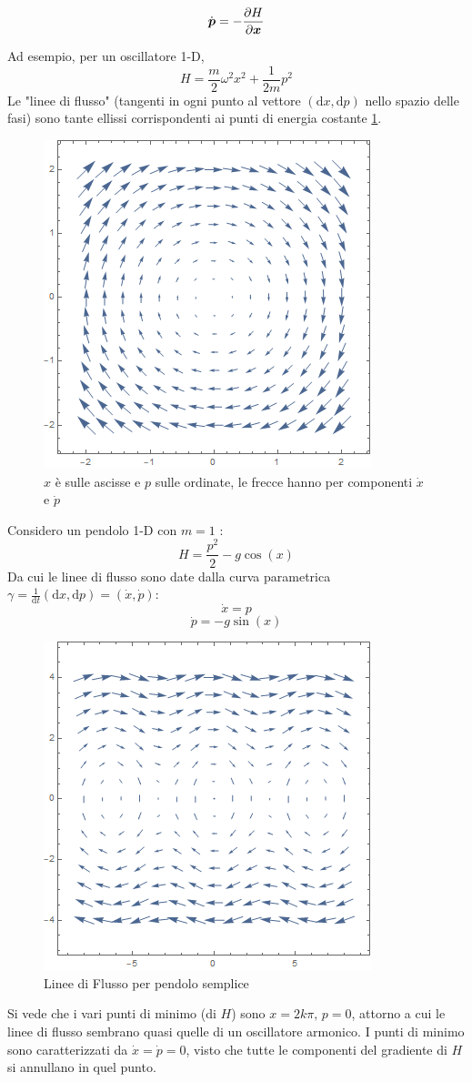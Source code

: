\documentclass[a4paper,12pt]{article}
\theoremstyle{plain}
\renewcommand{\vec}[1]{{\boldsymbol{#1}}}
\theoremstyle{definition}
\newcommand{\f}[2]{\frac{#1}{#2}}
\renewcommand{\d}{\text{d}}
\newcommand{\pos}{\vec{x}}
\newcommand{\mom}{\vec{p}}
\theoremstyle{remark}
\begin{document}
\[\dot{\mom}=-\pdv{H}{\pos}			\]

Ad esempio, per un oscillatore 1-D, \[H=\f{m}{2}\omega^2 x^2+\f{1}{2m} p^2 \]
Le "linee di flusso" (tangenti in ogni punto al vettore $(\d x,\d p)$ nello spazio delle fasi) sono tante ellissi corrispondenti ai punti di energia costante \ref{ellissi}.\\
\begin{figure}[h]
	\centering
	\includegraphics[scale=0.5]{oscillator.png}
	\caption{$x$ è sulle ascisse e $p$ sulle ordinate, le frecce hanno per componenti $\dot{x}$ e $\dot{p}$}
	\label{ellissi}
\end{figure}
Considero un pendolo 1-D con  $m=1$ :
\[H=\f{ p^2}{2}-g \cos(x)		\]
Da cui le linee di flusso sono date dalla curva parametrica $ \gamma=\f{1}{\d t}(\d x,\d p)=(\dot{x},\dot{p})$:
\[\dot{x}=p\]
\[\dot{p}=-g\sin(x)\]
\begin{figure}[h]
	\centering
	\includegraphics[scale=0.5]{pend1.png}
	\caption{Linee di Flusso per pendolo semplice}
\end{figure}
Si vede che i vari punti di minimo (di $H$) sono $x=2k\pi,\,p=0$, attorno a cui le linee di flusso sembrano quasi quelle di un oscillatore armonico. I punti di minimo sono caratterizzati da $\dot{x}=\dot{p}=0$, visto che tutte le componenti del gradiente di $H$ si annullano in quel punto.
\end{document}
